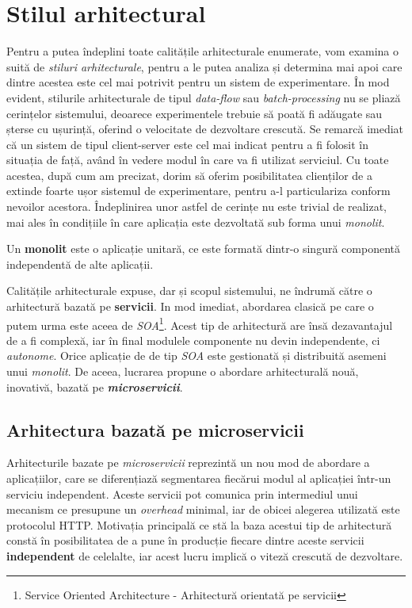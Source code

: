 \section{Stilul arhitectural}

Pentru a putea îndeplini toate calitățile arhitecturale enumerate, vom examina o suită de \textit{stiluri arhitecturale}, pentru a le putea analiza și determina mai apoi care dintre acestea este cel mai potrivit pentru un sistem de experimentare. În mod evident, stilurile arhitecturale de tipul \textit{data-flow} sau \textit{batch-processing} nu se pliază cerințelor sistemului, deoarece experimentele trebuie să poată fi adăugate sau șterse cu ușurință, oferind o velocitate de dezvoltare crescută. Se remarcă imediat că un sistem de tipul client-server este cel mai indicat pentru a fi folosit în situația de față, având în vedere modul în care va fi utilizat serviciul. Cu toate acestea, după cum am precizat, dorim să oferim posibilitatea clienților de a extinde foarte ușor sistemul de experimentare, pentru a-l particulariza conform nevoilor acestora. Îndeplinirea unor astfel de cerințe nu este trivial de realizat, mai ales în condițiile în care aplicația este dezvoltată sub forma unui \textit{monolit}.

\begin{definition}
	Un \textbf{monolit} este o aplicație unitară, ce este formată dintr-o singură componentă independentă de alte aplicații.
\end{definition}

Calitățile arhitecturale expuse, dar și scopul sistemului, ne îndrumă către o arhitectură bazată pe \textbf{servicii\textit{}}. In mod imediat, abordarea clasică pe care o putem urma este aceea de \textit{SOA}\footnote{Service Oriented Architecture - Arhitectură orientată pe servicii}. Acest tip de arhitectură are însă dezavantajul de a fi complexă, iar în final modulele componente nu devin independente, ci \textit{autonome}. Orice aplicație de de tip \textit{SOA} este gestionată și distribuită asemeni unui \textit{monolit}. De aceea, lucrarea propune o abordare arhitecturală nouă, inovativă, bazată pe \textbf{\textit{microservicii}}.\cite{buildingmicro} 

\subsection{Arhitectura bazată pe microservicii}

Arhitecturile bazate pe \textit{microservicii} reprezintă un nou mod de abordare a aplicațiilor, care se diferențiază segmentarea fiecărui modul al aplicației într-un serviciu independent. Aceste servicii pot comunica prin intermediul unui mecanism ce presupune un \textit{overhead} minimal, iar de obicei alegerea utilizată este protocolul HTTP\cite{onmicro}. Motivația principală ce stă la baza acestui tip de arhitectură constă în posibilitatea de a pune în producție fiecare dintre aceste servicii \textbf{independent} de celelalte, iar acest lucru implică o viteză crescută de dezvoltare.

